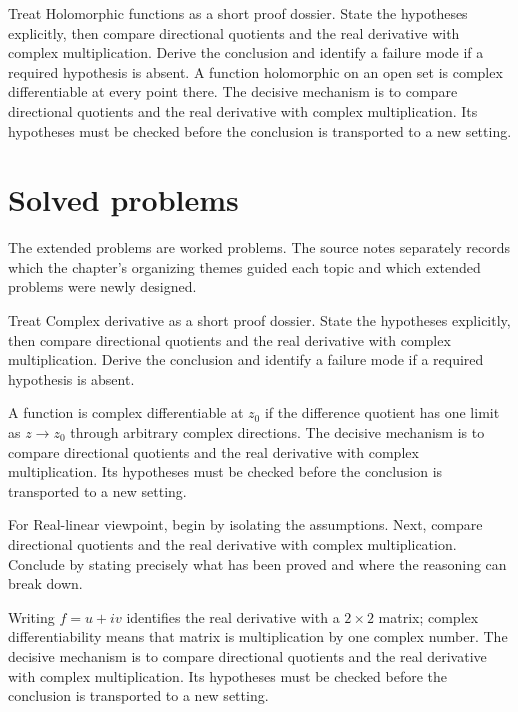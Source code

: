 \begin{example}\label{ex:iv01-worked-04}
Treat Holomorphic functions as a short proof dossier. State the hypotheses explicitly, then compare directional quotients and the real derivative with complex multiplication. Derive the conclusion and identify a failure mode if a required hypothesis is absent. A function holomorphic on an open set is complex differentiable at every point there. The decisive mechanism is to compare directional quotients and the real derivative with complex multiplication. Its hypotheses must be checked before the conclusion is transported to a new setting.
\end{example}

\section{Solved problems}
The extended problems are worked problems. The source notes separately records which the chapter's organizing themes guided each topic and which extended problems were newly designed.

\begin{problem}\label{prob:iv01-problem-01}
Treat Complex derivative as a short proof dossier. State the hypotheses explicitly, then compare directional quotients and the real derivative with complex multiplication. Derive the conclusion and identify a failure mode if a required hypothesis is absent.
\end{problem}
\begin{solution}
A function is complex differentiable at $z_0$ if the difference quotient has one limit as $z\to z_0$ through arbitrary complex directions. The decisive mechanism is to compare directional quotients and the real derivative with complex multiplication. Its hypotheses must be checked before the conclusion is transported to a new setting.
\end{solution}

\begin{problem}\label{prob:iv01-problem-02}
For Real-linear viewpoint, begin by isolating the assumptions. Next, compare directional quotients and the real derivative with complex multiplication. Conclude by stating precisely what has been proved and where the reasoning can break down.
\end{problem}
\begin{solution}
Writing $f=u+iv$ identifies the real derivative with a $2\times2$ matrix; complex differentiability means that matrix is multiplication by one complex number. The decisive mechanism is to compare directional quotients and the real derivative with complex multiplication. Its hypotheses must be checked before the conclusion is transported to a new setting.
\end{solution}

